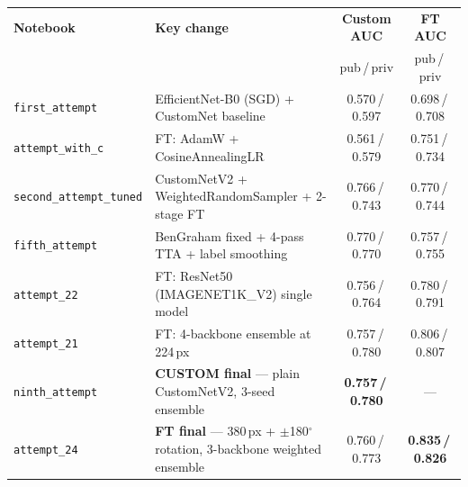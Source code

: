 \documentclass[a4paper, 10pt, twocolumn]{article}
\begin{document}
\label{tab:traj}
\vspace{3pt}
\footnotesize
\setlength{\tabcolsep}{5pt}
\renewcommand{\arraystretch}{1.10}
\begin{tabularx}{\textwidth}{@{}lXcc@{}}
\toprule
\textbf{Notebook} & \textbf{Key change} &
  \textbf{Custom AUC} & \textbf{FT AUC} \\
 & & \scriptsize pub\,/\,priv & \scriptsize pub\,/\,priv \\
\midrule
\texttt{first\_attempt}        & EfficientNet-B0 (SGD) + CustomNet baseline
                                & 0.570\,/\,0.597 & 0.698\,/\,0.708 \\
\texttt{attempt\_with\_c}      & FT: AdamW + CosineAnnealingLR
                                & 0.561\,/\,0.579 & 0.751\,/\,0.734 \\
\texttt{second\_attempt\_tuned}& CustomNetV2 + WeightedRandomSampler + 2-stage FT
                                & 0.766\,/\,0.743 & 0.770\,/\,0.744 \\
\texttt{fifth\_attempt}        & BenGraham fixed + 4-pass TTA + label smoothing
                                & 0.770\,/\,0.770 & 0.757\,/\,0.755 \\
\texttt{attempt\_22}           & FT: ResNet50 (IMAGENET1K\_V2) single model
                                & 0.756\,/\,0.764 & 0.780\,/\,0.791 \\
\texttt{attempt\_21}           & FT: 4-backbone ensemble at 224\,px
                                & 0.757\,/\,0.780 & 0.806\,/\,0.807 \\
\rowcolor{rowbest}
\texttt{ninth\_attempt}        & \textbf{CUSTOM final} --- plain CustomNetV2, 3-seed ensemble
                                & \textbf{0.757\,/\,0.780} & --- \\
\rowcolor{rowbest}
\texttt{attempt\_24}           & \textbf{FT final} --- 380\,px + $\pm$180$^\circ$ rotation, 3-backbone weighted ensemble
                                & 0.760\,/\,0.773 & \textbf{0.835\,/\,0.826} \\
\bottomrule
\end{tabularx}

\vspace{12pt}
\end{document}

